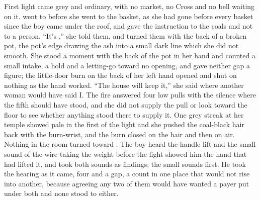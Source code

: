 First light came grey and ordinary, with no market, no Cross and no bell waiting on it.  went to  before she went to the basket, as she had gone before every basket since the boy came under the roof, and gave the instruction to the coals and not to a person. “It's ,” she told them, and turned them with the back of a broken pot, the pot's edge drawing the ash into a small dark line which she did not smooth. She stood a moment with the back of the pot in her hand and counted a small intake, a hold and a letting-go toward no opening, and gave neither gap a figure; the little-door burn on the back of her left hand opened and shut on nothing as the hand worked. “The house will keep it,” she said where another woman would have said I. The fire answered four low pulls with the silence where the fifth should have stood, and she did not supply the pull or look toward the floor to see whether anything stood there to supply it. One grey streak at her temple showed pale in the first of the light and she pushed the coal-black hair back with the burn-wrist, and the burn closed on the hair and then on air. Nothing in the room turned toward . The boy heard the handle lift and the small sound of the wire taking the weight before the light showed him the hand that had lifted it, and took both sounds as findings: the small sounds first. He took the hearing as it came, four and a gap, a count in one place that would not rise into another, because agreeing any two of them would have wanted a payer put under both and none stood to either.

